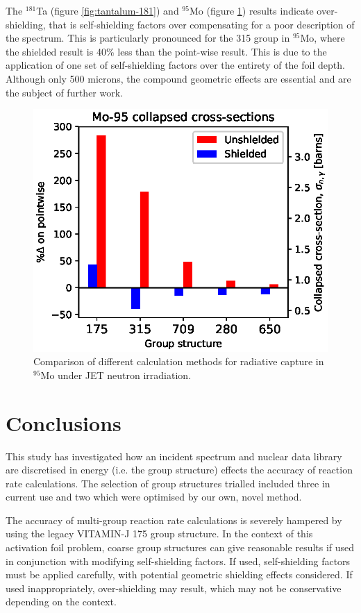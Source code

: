 The $^{181}$Ta (figure \ref{fig:tantalum-181}) and $^{95}$Mo (figure \ref{fig:molybdenum-95}) results indicate over-shielding, that is self-shielding factors over compensating for a poor description of the spectrum. This is particularly pronounced for the 315 group in $^{95}$Mo, where the shielded result is 40\% less than the point-wise result. This is due to the application of one set of self-shielding factors over the entirety of the foil depth. Although only 500 microns, the compound geometric effects are essential and are the subject of further work.

\begin{figure}[h]
\centering
\includegraphics[width=\linewidth]{Mo-95.eps}
\caption{Comparison of different calculation methods for radiative capture in $^{95}$Mo under JET neutron irradiation.}
\label{fig:molybdenum-95}
\end{figure}

\section{Conclusions}

This study has investigated how an incident spectrum and nuclear data library are discretised in energy (i.e. the group structure) effects the accuracy of reaction rate calculations. The selection of group structures trialled included three in current use and two which were optimised by our own, novel method.

The accuracy of multi-group reaction rate calculations is severely hampered by using the legacy VITAMIN-J 175 group structure. In the context of this activation foil problem, coarse group structures can give reasonable results if used in conjunction with modifying self-shielding factors. If used, self-shielding factors must be applied carefully, with potential geometric shielding effects considered. If used inappropriately, over-shielding may result, which may not be conservative depending on the context.

